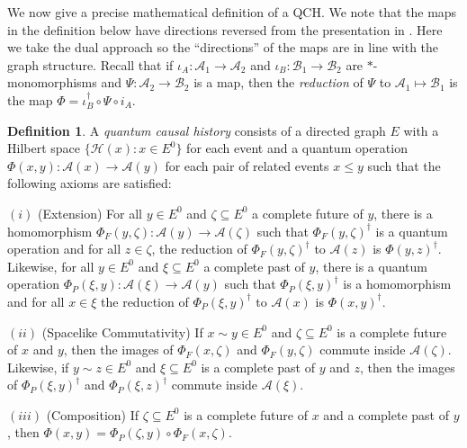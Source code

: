 \documentclass[12pt]{amsart}
\theoremstyle{plain}
\theoremstyle{definition}
\newtheorem{rem}[thm]{Remark}
\newtheorem{defn}[thm]{Definition}
\newcommand{\A}{{\mathcal{A}}}
\newcommand{\B}{{\mathcal{B}}}
\renewcommand{\H}{{\mathcal{H}}}
\begin{document}
We now give a precise mathematical definition of a QCH. We note
that the maps in the definition below have directions reversed
from the presentation in \cite{HMS}. Here we take the dual
approach so the ``directions'' of the maps are in line with the
graph structure. Recall that if $\iota_A: \A_1\rightarrow\A_2$ and
$\iota_B: \B_1\rightarrow\B_2$ are $\ast$-monomorphisms and $\Psi:
\A_2\rightarrow\B_2$ is a map, then the {\it reduction} of $\Psi$
to $\A_1\mapsto\B_1$ is the map $\Phi = \iota_B^\dagger \circ \Psi
\circ i_A$.

\begin{defn}
A {\it quantum causal history} consists of a directed graph $E$
with a Hilbert space $\{\H(x): x\in E^0\}$ for each event and a
quantum operation $\Phi (x,y) : \A(x)\rightarrow\A(y)$ for each
pair of related events $x\leq y$ such that the following axioms
are satisfied:

$(i)$ (Extension) For all $y\in E^0$ and $\zeta\subseteq E^0$ a
complete future of $y$, there is a homomorphism $\Phi_F(y,\zeta) :
\A(y)\rightarrow\A(\zeta)$ such that $\Phi_F(y,\zeta)^\dagger$ is
a quantum operation and for all $z\in\zeta$, the reduction of
$\Phi_F(y,\zeta)^\dagger$ to $\A(z)$ is $\Phi(y,z)^\dagger$.
Likewise, for all $y\in E^0$ and $\xi\subseteq E^0$ a complete
past of $y$, there is a quantum operation
$\Phi_P(\xi,y):\A(\xi)\rightarrow\A(y)$ such that
$\Phi_P(\xi,y)^\dagger$ is a homomorphism and for all $x\in\xi$
the reduction of $\Phi_P(\xi,y)^\dagger$ to $\A(x)$ is
$\Phi(x,y)^\dagger$.

$(ii)$ (Spacelike Commutativity)  If $x\sim y\in E^0$ and
$\zeta\subseteq E^0$ is a complete future of $x$ and $y$, then the
images of $\Phi_F(x,\zeta)$ and $\Phi_F(y,\zeta)$ commute inside
$\A(\zeta)$.  Likewise, if $y\sim z \in E^0$ and $\xi\subseteq
E^0$ is a complete past of $y$ and $z$, then the images of
$\Phi_P(\xi,y)^\dagger$ and $\Phi_P(\xi,z)^\dagger$ commute inside
$\A(\xi)$.

$(iii)$ (Composition) If $\zeta\subseteq E^0$ is a complete future
of $x$ and a complete past of $y$, then $\Phi(x,y) =
\Phi_P(\zeta,y)\circ\Phi_F(x,\zeta)$.
\end{defn}

\end{document}

